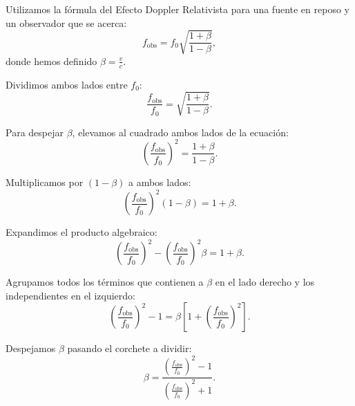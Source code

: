 \documentclass[12pt, a4paper]{article}
\begin{document}
\begin{solution}
Utilizamos la fórmula del Efecto Doppler Relativista para una fuente en reposo y un observador que se acerca:
    \begin{equation}
        f_{\text{obs}} = f_0 \sqrt{\frac{1 + \beta}{1 - \beta}},
    \end{equation}
    donde hemos definido $\beta = \frac{v}{c}$.
    
    Dividimos ambos lados entre $f_0$:
    \begin{equation}
        \frac{f_{\text{obs}}}{f_0} = \sqrt{\frac{1 + \beta}{1 - \beta}}.
    \end{equation}
    
    Para despejar $\beta$, elevamos al cuadrado ambos lados de la ecuación:
    \begin{equation}
        \left(\frac{f_{\text{obs}}}{f_0}\right)^2 = \frac{1 + \beta}{1 - \beta}.
    \end{equation}
    
    Multiplicamos por $(1 - \beta)$ a ambos lados:
    \begin{equation}
        \left(\frac{f_{\text{obs}}}{f_0}\right)^2 (1 - \beta) = 1 + \beta.
    \end{equation}
    
    Expandimos el producto algebraico:
    \begin{equation}
        \left(\frac{f_{\text{obs}}}{f_0}\right)^2 - \left(\frac{f_{\text{obs}}}{f_0}\right)^2 \beta = 1 + \beta.
    \end{equation}
    
    Agrupamos todos los términos que contienen a $\beta$ en el lado derecho y los independientes en el izquierdo:
    \begin{equation}
        \left(\frac{f_{\text{obs}}}{f_0}\right)^2 - 1 = \beta \left[ 1 + \left(\frac{f_{\text{obs}}}{f_0}\right)^2 \right].
    \end{equation}
    
    Despejamos $\beta$ pasando el corchete a dividir:
    \begin{equation}
        \beta = \frac{\left(\frac{f_{\text{obs}}}{f_0}\right)^2 - 1}{\left(\frac{f_{\text{obs}}}{f_0}\right)^2 + 1}.
        \label{eq:beta_fotomulta}
    \end{equation}
    

\end{solution}
\end{document}
